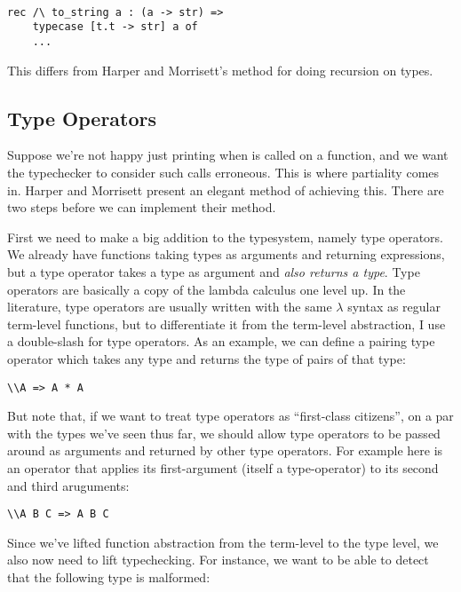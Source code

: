 \documentclass[pageno]{jpaper}
\begin{document}
{{{\begin{lstlisting}[mathescape]

rec /\ to_string a : (a -> str) =>
    typecase [t.t -> str] a of
    ...

\end{lstlisting}

This differs from Harper and Morrisett's method for doing recursion on types.

\subsection{Type Operators}

Suppose we're not happy just printing  when  is called on a function,
and we want the typechecker to consider such calls erroneous.  This is where partiality comes in.
Harper and Morrisett present an elegant method of achieving this. There are two steps before
we can implement their method.

First we need to make a big addition to the typesystem, namely type operators.
We already have functions taking types as arguments and returning expressions, but a type operator takes
a type as argument and \textit{also returns a type}.
Type operators are basically a copy of the lambda calculus one level up.  In the literature, type operators are usually written with the same $\lambda$ syntax as regular term-level functions, but to differentiate it from
the term-level abstraction, I use a double-slash \lsti{\\} for type operators. As an example, we can define
a pairing type operator which takes any type and returns the type of pairs of that type:

\begin{lstlisting}
\\A => A * A
\end{lstlisting}

But note that, if we want to treat type operators as ``first-class citizens'', on a par with the types
we've seen thus far, we should allow type operators to be passed around as arguments and returned by other
type operators. For example here is an operator that applies its first-argument (itself a type-operator)
to its second and third aruguments:

\begin{lstlisting}
\\A B C => A B C
\end{lstlisting}

Since we've lifted function abstraction from the term-level to the type level, we also now need to lift
typechecking. For instance, we want to be able to detect that the following type is malformed:

}}}
\end{document}
